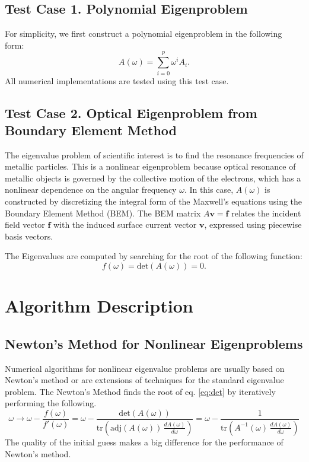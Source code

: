 \documentclass[11pt,letterpaper]{article}
\begin{document}
\begin{multicols}{2}
\subsection*{Test Case 1. Polynomial Eigenproblem}
For simplicity, we first construct a polynomial eigenproblem in the following form:
\begin{equation}\label{eq:polyeig}
A(\omega)=\sum\limits_{i=0}^{p}\omega^iA_i.
\end{equation}
All numerical implementations are tested using this test case. 
\subsection*{Test Case 2. Optical Eigenproblem from Boundary Element Method}
The eigenvalue problem of scientific interest is to find the resonance frequencies of metallic particles. This is a nonlinear eigenproblem because optical resonance of metallic objects is governed by the collective motion of the electrons, which has a nonlinear dependence on the angular frequency $\omega$. 
In this case, $A(\omega)$ is constructed by discretizing the integral form of the Maxwell's equations using the Boundary Element Method (BEM). The BEM matrix $A\mathbf{v}=\mathbf{f}$ relates the incident field vector $\mathbf{f}$ with the induced surface current vector $\mathbf{v}$, expressed using piecewise basis vectors. 

The Eigenvalues are computed by searching for the root of the following function:
\begin{equation}\label{eq:det}
f(\omega)=\text{det}\left(A(\omega)\right) = 0.
\end{equation}  

\section{Algorithm Description}
\subsection*{Newton's Method for Nonlinear Eigenproblems}
Numerical algorithms for nonlinear eigenvalue problems are usually based on Newton's method or are extensions of techniques for the standard eigenvalue problem. The Newton's Method finds the root of eq. \ref{eq:det} by iteratively performing the following.
\begin{equation}
\omega \rightarrow \omega - \frac{f(\omega)}{f'(\omega)} = \omega - \frac{\mathrm{det}(A(\omega))}{ \mathrm{tr} \left( \mathrm{adj}(A(\omega))\,\frac{dA(\omega)}{d\omega} \right)}
= \omega - \frac{1}{ \mathrm{tr} \left( A^{-1}(\omega)\,\frac{dA(\omega)}{d\omega} \right)}
\end{equation}
The quality of the initial guess makes a big difference for the performance of Newton's method. 

\end{multicols}
\end{document}
